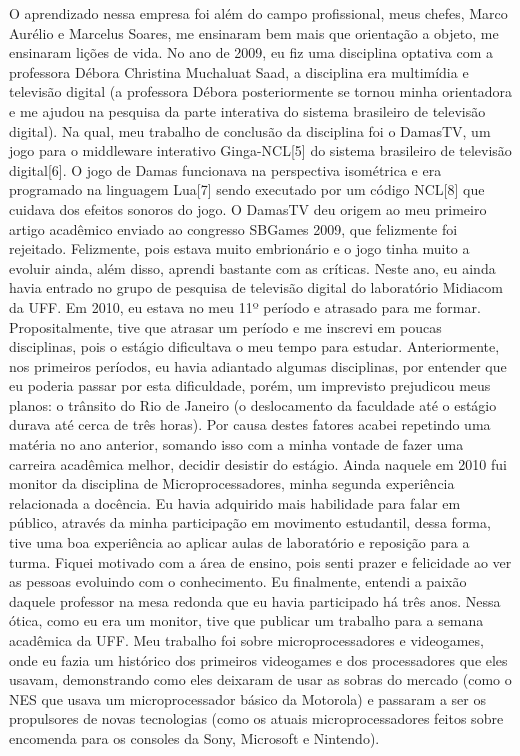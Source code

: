 \documentclass[10pt,a4paper,oneside]{book}
\begin{document}
O aprendizado nessa empresa foi além do campo profissional, meus chefes, Marco Aurélio e Marcelus Soares, me ensinaram bem mais que  orientação a objeto,  me ensinaram lições de vida.
No ano de 2009, eu fiz uma disciplina optativa com a professora Débora Christina Muchaluat Saad, a disciplina era multimídia e televisão digital (a professora Débora posteriormente se tornou minha orientadora e me ajudou na pesquisa da parte interativa do sistema brasileiro de televisão digital). Na qual, meu trabalho de conclusão da disciplina foi o DamasTV, um jogo para o middleware interativo Ginga-NCL[5] do sistema brasileiro de televisão digital[6]. O jogo de Damas funcionava na perspectiva isométrica e era programado na linguagem Lua[7] sendo executado por um código NCL[8] que cuidava dos efeitos sonoros do jogo.
O DamasTV deu origem ao meu primeiro artigo acadêmico enviado ao congresso SBGames 2009, que felizmente foi rejeitado. Felizmente, pois estava muito embrionário e o jogo tinha muito a evoluir ainda, além disso, aprendi bastante com as críticas. Neste ano, eu ainda havia entrado no grupo de pesquisa de televisão digital do laboratório Midiacom da UFF.
Em 2010, eu estava no meu 11º período e atrasado para me formar. Propositalmente, tive que atrasar um período e me inscrevi em poucas disciplinas, pois o estágio dificultava o meu tempo para estudar. Anteriormente, nos primeiros períodos, eu havia adiantado algumas disciplinas, por entender que eu poderia passar por esta dificuldade, porém, um imprevisto prejudicou meus planos: o trânsito do Rio de Janeiro (o deslocamento da faculdade até o estágio durava até cerca de três horas).
 Por causa destes fatores acabei repetindo uma matéria no ano anterior, somando isso com a minha vontade de fazer uma carreira acadêmica melhor, decidir desistir do estágio.
Ainda naquele em 2010 fui monitor da disciplina de Microprocessadores,  minha segunda experiência relacionada a docência. Eu havia adquirido mais habilidade para falar em público, através da minha participação em movimento estudantil, dessa forma,  tive uma boa experiência ao aplicar aulas de laboratório e reposição para a turma. Fiquei motivado com a área de ensino, pois senti prazer e felicidade ao ver as pessoas evoluindo com o conhecimento. Eu finalmente, entendi a paixão daquele professor na mesa redonda que eu havia participado há três anos.
Nessa ótica, como eu era um monitor, tive que publicar um trabalho para a semana acadêmica da UFF.  Meu trabalho foi sobre microprocessadores e videogames, onde eu fazia um histórico dos primeiros videogames e dos processadores que eles usavam, demonstrando como eles deixaram de usar as sobras do mercado (como o NES que usava um microprocessador básico da Motorola) e passaram a ser os propulsores de novas tecnologias (como os atuais microprocessadores feitos sobre encomenda para os consoles da Sony, Microsoft e Nintendo).
\end{document}

